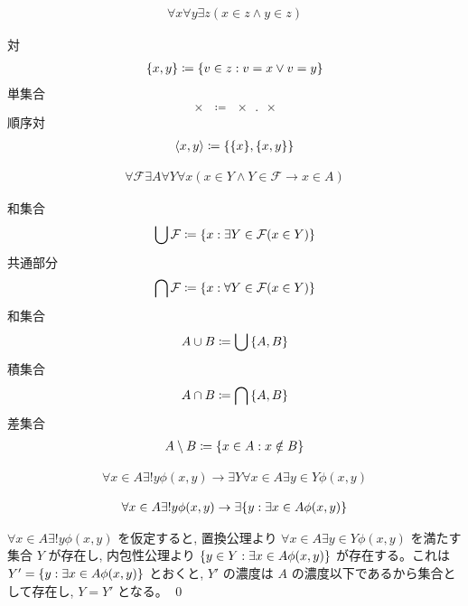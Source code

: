 \documentclass[uplatex,dvipdfmx,a4paper,11pt]{jlreq}
\makeatletter
\theoremstyle{definition}
\renewenvironment{proof}[1][\proofname]{\par
  \normalfont
  \topsep6\p@\@plus6\p@ \trivlist
  \item[\hskip\labelsep{\bfseries #1}\@addpunct{\bfseries}]\ignorespaces\quad\par
}{%
  \qed\endtrivlist\@endpefalse
}
\renewcommand\proofname{証明}
\makeatother
\begin{document}
\begin{axiom}[対]
  \begin{align}
    \forall x\forall y\exists z(x\in z\land y\in z)
  \end{align}
\end{axiom}

\begin{definition}
  対
  \begin{align}
    \qty{x, y}\coloneq\qty{v\in z:v=x\lor v=y}
  \end{align}
  単集合
  \begin{align}
    \qty{x}\coloneq\qty{x, x}
  \end{align}
  順序対
  \begin{align}
    \ev{x, y}\coloneq\qty{\qty{x}, \qty{x,y}}
  \end{align}
\end{definition}
\begin{axiom}[和集合]
  \begin{align}
    \forall\mathcal{F}\exists A\forall Y\forall x(x\in Y\land Y\in\mathcal{F}\to x\in A)
  \end{align}
\end{axiom}
\begin{definition}
  和集合
  \begin{align}
    \bigcup\mathcal{F}\coloneq\qty{x:\exists Y\in\mathcal{F}(x\in Y)}
  \end{align}
  共通部分
  \begin{align}
    \bigcap\mathcal{F}\coloneq\qty{x:\forall Y\in\mathcal{F}(x\in Y)}
  \end{align}
  和集合
  \begin{align}
    A\cup B\coloneq\bigcup\qty{A, B}
  \end{align}
  積集合
  \begin{align}
    A\cap B\coloneq\bigcap\qty{A, B}
  \end{align}
  差集合
  \begin{align}
    A\setminus B\coloneq\qty{x\in A:x\notin B}
  \end{align}
\end{definition}
\begin{axiom}[置換図式]
  \begin{align}
    \forall x\in A\exists!y\phi(x,y)\to\exists Y\forall x\in A\exists y\in Y\phi(x,y)
  \end{align}
\end{axiom}

\begin{theorem}[置換図式]
  \begin{align}
    \forall x\in A\exists!y\phi(x,y)\to\exists\qty{y:\exists x\in A\phi(x,y)}
  \end{align}
\end{theorem}
\begin{proof}
  $\forall x\in A\exists!y\phi(x,y)$ を仮定すると, 置換公理より $\forall x\in A\exists y\in Y\phi(x,y)$ を満たす集合 $Y$ が存在し, 内包性公理より $\qty{y\in Y:\exists x\in A\phi(x,y)}$ が存在する。これは $Y'=\qty{y:\exists x\in A\phi(x,y)}$ とおくと, $Y'$ の濃度は $A$ の濃度以下であるから集合として存在し, $Y = Y'$ となる。
\end{proof}
\end{document}
